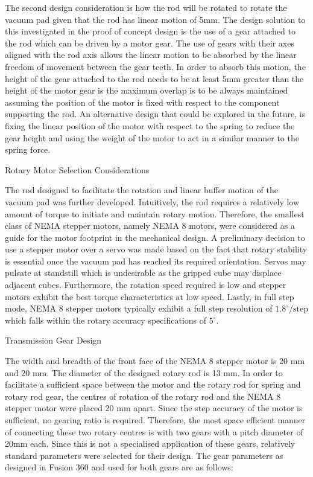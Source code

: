 The second design consideration is how the rod will be rotated to rotate the vacuum pad given that the rod has linear motion of 5mm. The design solution to this investigated in the proof of concept design is the use of a gear attached to the rod which can be driven by a motor gear. The use of gears with their axes aligned with the rod axis allows the linear motion to be absorbed by the linear freedom of movement between the gear teeth. In order to absorb this motion, the height of the gear attached to the rod needs to be at least 5mm greater than the height of the motor gear is the maximum overlap is to be always maintained assuming the position of the motor is fixed with respect to the component supporting the rod. An alternative design that could be explored in the future, is fixing the linear position of the motor with respect to the spring to reduce the gear height and using the weight of the motor to act in a similar manner to the spring force.

Rotary Motor Selection Considerations

The rod designed to facilitate the rotation and linear buffer motion of the vacuum pad was further developed. Intuitively, the rod requires a relatively low amount of torque to initiate and maintain rotary motion. Therefore, the smallest class of NEMA stepper motors, namely NEMA 8 motors, were considered as a guide for the motor footprint in the mechanical design. A preliminary decision to use a stepper motor over a servo was made based on the fact that rotary stability is essential once the vacuum pad has reached its required orientation. Servos may pulsate at standstill which is undesirable as the gripped cube may displace adjacent cubes. Furthermore, the rotation speed required is low and stepper motors exhibit the best torque characteristics at low speed. Lastly, in full step mode, NEMA 8 stepper motors typically exhibit a full step resolution of $1.8 ^\circ / \text{step}$ which falls within the rotary accuracy specifications of $5 ^\circ$.

Transmission Gear Design

The width and breadth of the front face of the NEMA 8 stepper motor is 20 mm and 20 mm. The diameter of the designed rotary rod is 13 mm. In order to facilitate a sufficient space between the motor and the rotary rod for spring and rotary rod gear, the centres of rotation of the rotary rod and the NEMA 8 stepper motor were placed 20 mm apart. Since the step accuracy of the motor is sufficient, no gearing ratio is required. Therefore, the most space efficient manner of connecting these two rotary centres is with two gears with a pitch diameter of 20mm each. Since this is not a specialised application of these gears, relatively standard parameters were selected for their design. The gear parameters as designed in Fusion 360 and used for both gears are as follows:

